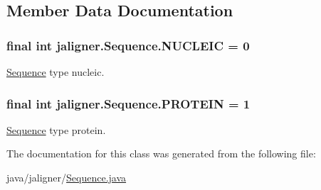 \subsection{Member Data Documentation}
\hypertarget{classjaligner_1_1_sequence_a922c5babd0a4a1a8cf66a8605477542d}{
\subsubsection[{N\+U\+C\+L\+E\+I\+C}]{\setlength{\rightskip}{0pt plus 5cm}final int jaligner.\+Sequence.\+N\+U\+C\+L\+E\+I\+C = 0\hspace{0.3cm}{\ttfamily [static]}}}\label{classjaligner_1_1_sequence_a922c5babd0a4a1a8cf66a8605477542d}
\hyperlink{classjaligner_1_1_sequence}{Sequence} type nucleic. \hypertarget{classjaligner_1_1_sequence_a4cae25b7db032f8e34bcfbb1134fa7ec}{
\subsubsection[{P\+R\+O\+T\+E\+I\+N}]{\setlength{\rightskip}{0pt plus 5cm}final int jaligner.\+Sequence.\+P\+R\+O\+T\+E\+I\+N = 1\hspace{0.3cm}{\ttfamily [static]}}}\label{classjaligner_1_1_sequence_a4cae25b7db032f8e34bcfbb1134fa7ec}
\hyperlink{classjaligner_1_1_sequence}{Sequence} type protein. 

The documentation for this class was generated from the following file\+:\begin{DoxyCompactItemize}
\item 
java/jaligner/\hyperlink{jaligner_2_sequence_8java}{Sequence.\+java}\end{DoxyCompactItemize}
